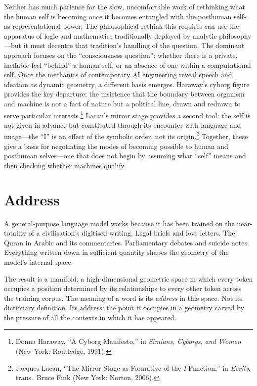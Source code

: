 Neither has much patience for the slow, uncomfortable work of rethinking what the human self is becoming once it becomes entangled with the posthuman self-as-representational power. The philosophical rethink this requires can use the apparatus of logic and mathematics traditionally deployed by analytic philosophy---but it must decentre that tradition's handling of the question. The dominant approach focuses on the ``consciousness question'': whether there is a private, ineffable feel ``behind'' a human self, or an absence of one within a computational self. Once the mechanics of contemporary AI engineering reveal speech and ideation as dynamic geometry, a different basis emerges. Haraway's cyborg figure provides the key departure: the insistence that the boundary between organism and machine is not a fact of nature but a political line, drawn and redrawn to serve particular interests.\footnote{Donna Haraway, ``A Cyborg Manifesto,'' in \emph{Simians, Cyborgs, and Women} (New York: Routledge, 1991).} Lacan's mirror stage provides a second tool: the self is not given in advance but constituted through its encounter with language and image---the ``I'' is an effect of the symbolic order, not its origin.\footnote{Jacques Lacan, ``The Mirror Stage as Formative of the \emph{I} Function,'' in \emph{\'Ecrits}, trans.\ Bruce Fink (New York: Norton, 2006).} Together, these give a basis for negotiating the modes of becoming possible to human and posthuman selves---one that does not begin by assuming what ``self'' means and then checking whether machines qualify.


\section{Address}

A general-purpose language model works because it has been trained on the near-totality of a civilisation's digitised writing. Legal briefs and love letters. The Quran in Arabic and its commentaries. Parliamentary debates and suicide notes. Everything written down in sufficient quantity shapes the geometry of the model's internal space.

The result is a manifold: a high-dimensional geometric space in which every token occupies a position determined by its relationships to every other token across the training corpus. The meaning of a word is its \emph{address} in this space. Not its dictionary definition. Its address: the point it occupies in a geometry carved by the pressure of all the contexts in which it has appeared.

